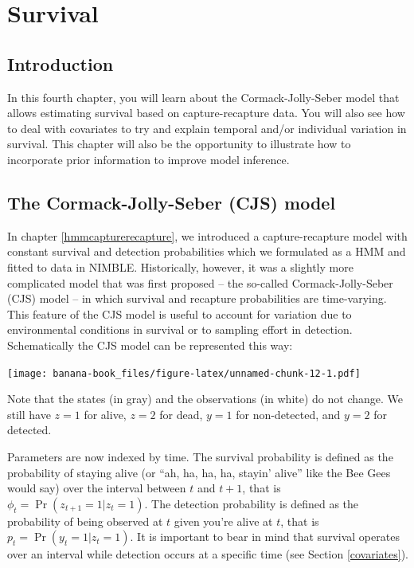 \documentclass[
  12pt,
]{krantz}
\begin{document}
\hypertarget{survival}{%
\chapter{Survival}\label{survival}}

\hypertarget{introduction-2}{%
\section{Introduction}\label{introduction-2}}

In this fourth chapter, you will learn about the Cormack-Jolly-Seber model that allows estimating survival based on capture-recapture data. You will also see how to deal with covariates to try and explain temporal and/or individual variation in survival. This chapter will also be the opportunity to illustrate how to incorporate prior information to improve model inference.

\hypertarget{the-cormack-jolly-seber-cjs-model}{%
\section{The Cormack-Jolly-Seber (CJS) model}\label{the-cormack-jolly-seber-cjs-model}}

In chapter \ref{hmmcapturerecapture}, we introduced a capture-recapture model with constant survival and detection probabilities which we formulated as a HMM and fitted to data in NIMBLE. Historically, however, it was a slightly more complicated model that was first proposed -- the so-called Cormack-Jolly-Seber (CJS) model -- in which survival and recapture probabilities are time-varying. This feature of the CJS model is useful to account for variation due to environmental conditions in survival or to sampling effort in detection. Schematically the CJS model can be represented this way:

\texttt{[image: banana-book\_files/figure-latex/unnamed-chunk-12-1.pdf]}

Note that the states (in gray) and the observations (in white) do not change. We still have \(z = 1\) for alive, \(z = 2\) for dead, \(y = 1\) for non-detected, and \(y = 2\) for detected.

Parameters are now indexed by time. The survival probability is defined as the probability of staying alive (or ``ah, ha, ha, ha, stayin' alive'' like the Bee Gees would say) over the interval between \(t\) and \(t+1\), that is \(\phi_t = \Pr(z_{t+1} = 1 | z_t = 1)\). The detection probability is defined as the probability of being observed at \(t\) given you're alive at \(t\), that is \(p_t = \Pr(y_{t} = 1 | z_t = 1)\). It is important to bear in mind that survival operates over an interval while detection occurs at a specific time (see Section \ref{covariates}).
\end{document}
